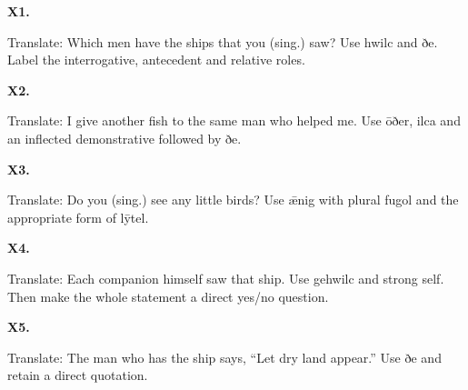\par\begin{minipage}{\linewidth}\raggedright
\textbf{X1.}

Translate: Which men have the ships that you (sing.) saw? Use hwilc and ðe. Label the interrogative, antecedent and relative roles.

\end{minipage}\par\addvspace{4pt}

\par\begin{minipage}{\linewidth}\raggedright
\textbf{X2.}

Translate: I give another fish to the same man who helped me. Use ōðer, ilca and an inflected demonstrative followed by ðe.

\end{minipage}\par\addvspace{4pt}

\par\begin{minipage}{\linewidth}\raggedright
\textbf{X3.}

Translate: Do you (sing.) see any little birds? Use ǣnig with plural fugol and the appropriate form of lȳtel.

\end{minipage}\par\addvspace{4pt}

\par\begin{minipage}{\linewidth}\raggedright
\textbf{X4.}

Translate: Each companion himself saw that ship. Use gehwilc and strong self. Then make the whole statement a direct yes/\allowbreak{}no question.

\end{minipage}\par\addvspace{4pt}

\par\begin{minipage}{\linewidth}\raggedright
\textbf{X5.}

Translate: The man who has the ship says, “Let dry land appear.” Use ðe and retain a direct quotation.

\end{minipage}\par\addvspace{4pt}

